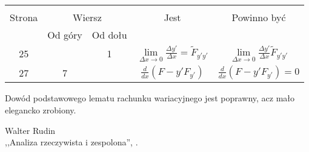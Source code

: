 \begin{center}
  \begin{tabular}{|c|c|c|c|c|}
    \hline
    & \multicolumn{2}{c|}{} & & \\
    Strona & \multicolumn{2}{c|}{Wiersz} & Jest
                              & Powinno być \\ \cline{2-3}
    & Od góry & Od dołu & & \\
    \hline
    25  & &  1 & $\lim\limits_{ \Delta x \to 0 }
                 \frac{ \Delta y' }{ \Delta x } = \tilde{ F }_{ y' y' }$
           & $\lim\limits_{ \Delta x \to 0 }
             \frac{ \Delta y' }{ \Delta x } \tilde{ F }_{ y' y' }$ \\
    27  &  7 & & $\frac{ d }{ dx }( F - y' F_{ y' } )$
           & $\frac{ d }{ dx }( F - y' F_{ y' } ) = 0$ \\
    \hline
  \end{tabular}
\end{center}

\vspace{\spaceTwo}








\start {} Dowód podstawowego lematu rachunku wariacyjnego jest
poprawny, acz mało elegancko zrobiony.



\vspace{\spaceTwo}



\begin{center}
  Walter Rudin \\
  ,,Analiza rzeczywista i zespolona'', \cite{WRARZ}.
\end{center}


